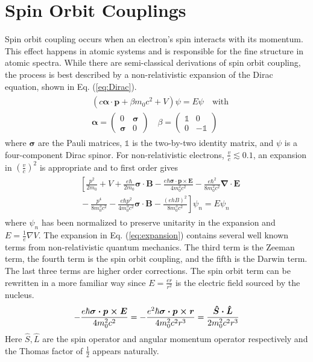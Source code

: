 \documentclass[12pt]{article}
\newcommand{\newln}{\\&{}}
\begin{document}
\section{Spin Orbit Couplings}
Spin orbit coupling occurs when an electron's spin interacts with its momentum.
This effect happens in atomic systems and is responsible for the fine structure in atomic spectra.
While there are semi-classical derivations of spin orbit coupling, the process is best described by a non-relativistic expansion of the Dirac equation\cite{Winkler}, shown in Eq. (\ref{eq:Dirac}).
\begin{align}\begin{split}
  \label{eq:Dirac}
  & (c\boldsymbol{\alpha\cdot p}+\beta m_{0}c^2+V)\psi=E\psi \quad\text{with}\newln\boldsymbol{\alpha}=\left(\begin{array}{cc} 0 & \boldsymbol{\sigma} \\ \boldsymbol{\sigma} & 0 \end{array} \right) \quad \beta=\left(\begin{array}{cc} \mathbb{1} & 0 \\ 0 & -\mathbb{1} \end{array} \right)
\end{split}\end{align}
where $\boldsymbol\sigma$ are the Pauli matrices, $\mathbb{1}$ is the two-by-two identity matrix, and $\psi$ is a four-component Dirac spinor.
For non-relativistic electrons, $\frac{v}{c}\lesssim 0.1$, an expansion in $(\frac{v}{c})^2$ is appropriate and  to first order gives
\begin{align}\begin{split}
  \label{eq:expansion}
  & \left [ \frac{p^2}{2m_0}\right.+V+\frac{e\hbar}{2m_0}\boldsymbol{\sigma\cdot B}-\frac{e\hbar\boldsymbol{\sigma\cdot p \times E}}{4m_0^2c^2}-\frac{e\hbar^2}{8m_0^2c^2}\boldsymbol{\nabla\cdot E} \newln-\frac{p^4}{8m_0^3c^2}-\frac{e\hbar p^2}{4m_0^3c^2}\boldsymbol{\sigma \cdot B}-\left.\frac{(ehB)^2}{8m_0^3c^2}\right]\psi_n=E\psi_n
\end{split}\end{align}
where $\psi_n$ has been normalized to preserve unitarity in the expansion and $E=\frac{1}{e}\nabla V$.
The expansion in Eq. (\ref{eq:expansion}) contains several well known terms from non-relativistic quantum mechanics.
The third term is the Zeeman term, the fourth term is the spin orbit coupling, and the fifth is the Darwin term.
The last three terms are higher order corrections.
The spin orbit term can be rewritten in a more familiar way since $E=\frac{e\hat{r}}{r^2}$ is the electric field sourced by the nucleus.
\begin{align}
  \label{eq:soc}
  -\frac{e\hbar\boldsymbol{\sigma\cdot p \times E}}{4m_0^2c^2}=-\frac{e^2\hbar\boldsymbol{\sigma\cdot p \times r}}{4m_0^2c^2r^3}\newline=\frac{\boldsymbol{\hat{S}\cdot \hat{L}}}{2m_0^2c^2r^3}
\end{align}
Here $\hat{S}, \hat{L}$ are the spin operator and angular momentum operator respectively and the Thomas factor of $\frac{1}{2}$ appears naturally.
\end{document}
